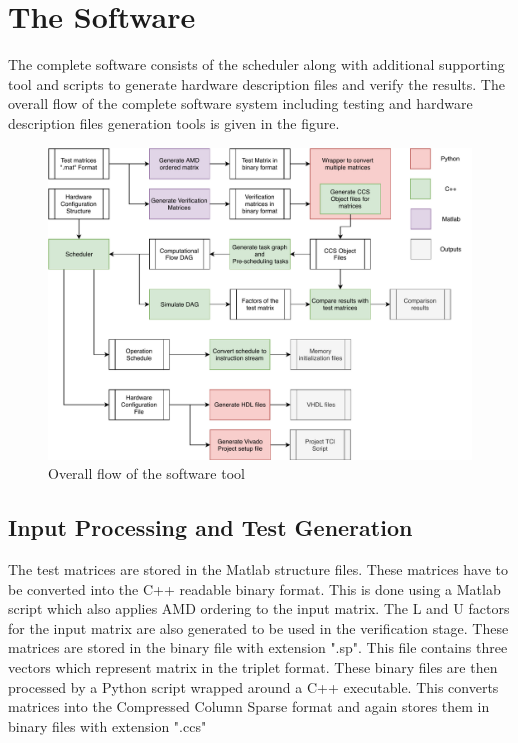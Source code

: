 \chapter{The Software}
The complete software consists of the scheduler along with additional supporting
tool and scripts to generate hardware description files and verify the results.
The overall flow of the complete software system including testing and hardware 
description files generation tools is given in the figure.

\begin{figure}[H]
    \centering
    \includegraphics[width = \textwidth]{./Software/softFlow.pdf}
    \caption{Overall flow of the software tool}
    \label{fig:soft:flow}
\end{figure}

\section{Input Processing and Test Generation}
The test matrices are stored in the Matlab structure files. These matrices have to be converted into the 
C++ readable binary format. This is done using a Matlab script which also applies AMD ordering to the 
input matrix. The L and U factors for the input matrix are also generated to be used in the verification stage.
These matrices are stored in the binary file with extension ".sp". This file contains three vectors which represent
matrix in the triplet format. These binary files are then processed by a Python script wrapped around a C++
executable. This converts matrices into the Compressed Column Sparse format and again stores them in binary files 
with extension ".ccs"

